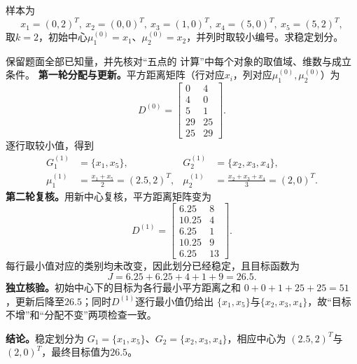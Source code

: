 \label{struct:V4-C02-CH18}
\label{struct:V4-C02-CH32}
\begin{example}\label{exm:V4-C02-five-points}
样本为
\[
x_1=(0,2)^T,\ x_2=(0,0)^T,\ x_3=(1,0)^T,\ x_4=(5,0)^T,\ x_5=(5,2)^T,
\]
取$k=2$，初始中心$\mu_1^{(0)}=x_1$、$\mu_2^{(0)}=x_2$，并列时取较小编号。求稳定划分。

\label{struct:V4-C02-CH33}
\end{example}
\begin{solution}
\SolGiven 保留题面全部已知量，并先核对“五点的 计算”中每个对象的取值域、维数与成立条件。
\SolDerive
\textbf{第一轮分配与更新。}平方距离矩阵（行对应$x_i$，列对应$\mu_1^{(0)},\mu_2^{(0)}$）为
\[
D^{(0)}=
\begin{bmatrix}
0&4\\
4&0\\
5&1\\
29&25\\
25&29
\end{bmatrix}.
\]
逐行取较小值，得到
\[
\begin{aligned}
G_1^{(1)}&=\{x_1,x_5\},&
G_2^{(1)}&=\{x_2,x_3,x_4\},\\
\mu_1^{(1)}&=\frac{x_1+x_5}{2}=(2.5,2)^T,&
\mu_2^{(1)}&=\frac{x_2+x_3+x_4}{3}=(2,0)^T.
\end{aligned}
\]
\textbf{第二轮复核。}用新中心复核，平方距离矩阵变为
\[
D^{(1)}=
\begin{bmatrix}
6.25&8\\
10.25&4\\
6.25&1\\
10.25&9\\
6.25&13
\end{bmatrix}.
\]
每行最小值对应的类别均未改变，因此划分已经稳定，且目标函数为
\[
J=6.25+6.25+4+1+9=26.5.
\]
\textbf{独立核验。}初始中心下的目标为各行最小平方距离之和
$0+0+1+25+25=51$，更新后降至$26.5$；同时$D^{(1)}$逐行最小值仍给出
$\{x_1,x_5\}$与$\{x_2,x_3,x_4\}$，故“目标不增”和“分配不变”两项检查一致。

\textbf{结论。}稳定划分为
$G_1=\{x_1,x_5\}$、$G_2=\{x_2,x_3,x_4\}$，相应中心为
$(2.5,2)^T$与$(2,0)^T$，最终目标值为$26.5$。
\end{solution}

